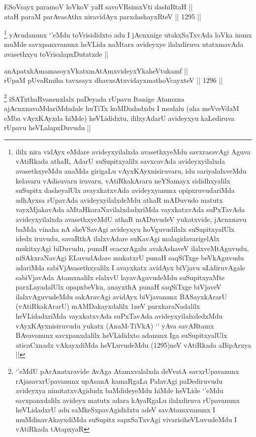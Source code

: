 
\begin{shl}
ESoV\s sayx paramoV loVkoV yaH savoVR\s simxVti dashiRtaH || \\
ataH paraM parAvasAthx niravidAyx parxdashayxRteV ||  1295 ||  
\end{shl}

\begin{artha}
\footnote{ililx nira vidAyx eMdare avideyxyilalxda avasethxyeMdu savxrasavAgi Aguva vAtiRkada athaR, AdarU suSupitxyalilx savxcavAda avideyxyilalxda avasethxyeMdu anaMda girigaLu vAyxKAyxnisiruvaru, idu sariyalalxveMdu kelavaru vAdisuvaru iruvaru, vAtiRkakAraru neYSamayx sididhxyalilx suSupitx dasheyalUlx avayxkatxvAda avideyxyanunx opipxruvudariMda adhAyxsa rUpavAda avideyxyilalxdeMdu athaR mADuvudo matutx vayxMjakavAda aMtaHkaraNavilalxdadxriMda vayxkatxvAda suPxTavAda avideyxyilalxda avasethxyeMdU athaR mADuvudeV yukatxvide, jAcnxnavu baMda vinaha nA sheVSavAgi avideyxyu hoVguvudilalx suSupitxyalUlx idedx iruvudu, savaRthA ilalxvAdare suKavAgi malagidavarigelAlx mukitxyAgi biDuvudu, punaH ecacxrAgalu avakAshaveV ilalxveMtAguvudu, niSAkxraNavAgi ELuvudAdare mukatxrU punaH saqSiTxge beVkAguvudu adariMda sabiVjAvasethxyalilx I avayxkatx avidAyx biVjavu uLidiruvAgale sabiVjavAda Atamxnalilx elalxvU layavAguvudeMdu suSupitxyaMte parxLayadalUlx opapxbeVku, anayxthA punaH saqSiTxge biVjaveV ilalxvAguvudeMdu sakAravAgi avidAyx biVjavanunx BASayxkArarU (vAtiRkakArarU) mAMDakayxdalilx 1neV parxkaraNadalilx heVLidadxriMda vayxkatxvAda suPxTavAda avideyxyilalxdedxMdu vAyxKAyxnisiruvudu yukatx (AnaM-TiVkA) `\stext' yAva savARtamx BAvavanunx savxpanxdalilx heVLididxto adanunx Iga suSupitxyalUlx aticaCxnadx vAkayxdiMda heVLuvudeMdu (1295)neV vAtiRkada aBipArxya ||}
yAvudanunx `\stext'eMdu toVrisididxto adu I jAcnxnige utakxSaTxvAda loVka inunx muMde savxpanxvanunx heVLida naMtara avideyxye ilalxdiruva utatxmavAda avasethxyu toVrisalapxDutatxde ||
\end{artha}


\begin{shl}
anApatxkAmamasoyxVkatxmAtAmxvideyxYkaheVtukamf || \\
rUpaM pUvaRmiha tavxsayx dhavxsAtxvidayxmathoVcayxteV ||  1296 ||  
\end{shl}

\begin{artha}
\footnote{`\stext'eMdU pArAnatxravide AvAga Atamxvalalxda deVvatA savxrUpavanunx rAjasavxrUpavanunx upAsanA kamaRgaLa PalavAgi paDediruvudu avideyxya nimitatxvAgidudx baMdideyeMdu hiMde heVLide `\stext'eMdu savxpanxdalilx avideyx matutx adara kAyaRgaLu ilalxdiruva rUpavanunx heVLidadxrU adu saMkeSxpavAgididxtu adeV savAtamxvanunx I muMdinavAkayxdiMda suSupitx sapxSaTxvAgi vivarisiheVLuvudeMdu I vAtiRkada tAtapxyaR} 
iSATxthaRvanenxlalx paDeyada rUpavu Itanige Atamxna ajAcnxnavoMdariMdadale huTiTx koMDadadxdu I modalu (aha meVveVdaM eMba vAyxKAyxda hiMde) heVLididxtu, ililxyAdarU avideyxyu kaLediruva rUpavu heVLalapxDuvudu ||
\end{artha}

